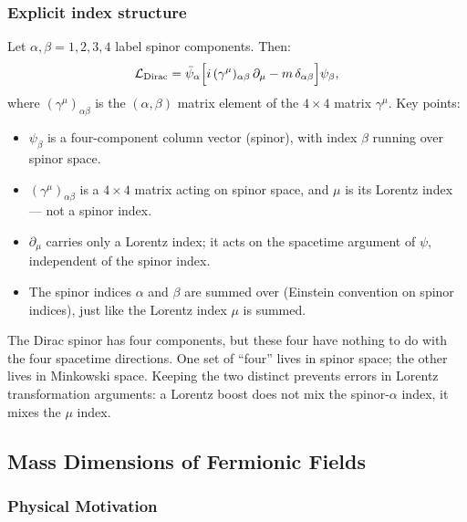 \documentclass[../main.tex]{subfiles}
\begin{document}
\subsubsection*{Explicit index structure}

Let $\alpha, \beta = 1,2,3,4$ label spinor components.  Then:
\begin{equation}
  \mathcal{L}_{\rm Dirac}
  = \bar\psi_\alpha\Bigl[i\,(\gamma^\mu)_{\alpha\beta}\,\partial_\mu
    - m\,\delta_{\alpha\beta}\Bigr]\psi_\beta,
  \label{eq:lec08:Lagr-components}
\end{equation}
where $(\gamma^\mu)_{\alpha\beta}$ is the $(\alpha,\beta)$ matrix element of the $4\times4$ matrix $\gamma^\mu$.  Key points:
\begin{itemize}
  \item $\psi_\beta$ is a four-component column vector (spinor), with index $\beta$ running over spinor space.
  \item $(\gamma^\mu)_{\alpha\beta}$ is a $4\times4$ matrix acting on spinor space, and $\mu$ is its Lorentz index — not a spinor index.
  \item $\partial_\mu$ carries only a Lorentz index; it acts on the spacetime argument of $\psi$, independent of the spinor index.
  \item The spinor indices $\alpha$ and $\beta$ are summed over (Einstein convention on spinor indices), just like the Lorentz index $\mu$ is summed.
\end{itemize}

\begin{remark}
The Dirac spinor has four components, but these four have nothing to do with the four spacetime directions.  One set of ``four'' lives in spinor space; the other lives in Minkowski space.  Keeping the two distinct prevents errors in Lorentz transformation arguments: a Lorentz boost does not mix the spinor-$\alpha$ index, it mixes the $\mu$ index.
\end{remark}

\subsection*{Mass Dimensions of Fermionic Fields}

\subsubsection*{Physical Motivation}
\end{document}
